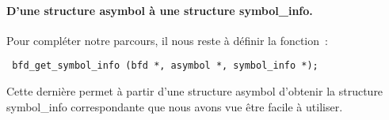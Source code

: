 \documentclass{article}
\begin{document}
\paragraph{D'une structure asymbol \`a une structure symbol\_info.}
Pour compl\'eter notre parcours, il nous reste \`a d\'efinir la fonction~:
\begin{verbatim}
 bfd_get_symbol_info (bfd *, asymbol *, symbol_info *);
\end{verbatim}
Cette derni\`ere permet \`a partir d'une structure asymbol d'obtenir
la structure symbol\_info correspondante que nous avons vue \^etre
facile \`a utiliser.
\end{document}
